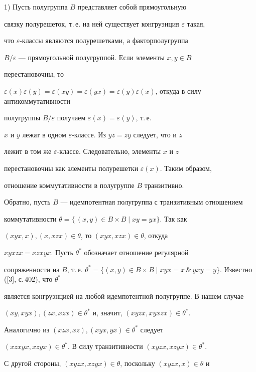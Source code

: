 \begin{pf}


1) Пусть полугруппа $B$ представляет собой прямоугольную


связку полурешеток, т.\,е. на ней существует конгруэнция $\varepsilon$ такая,


что $\varepsilon$-классы являются полурешетками, а факторполугруппа


$B/\varepsilon$ --- прямоугольной полугруппой. Если элементы $x,y\in B$


перестановочны, то


$\varepsilon(x)\varepsilon(y)=\varepsilon(xy)=\varepsilon(yx)


=\varepsilon(y)\varepsilon(x)$, откуда в силу антикоммутативности


полугруппы $B/\varepsilon$ получаем $\varepsilon(x)=\varepsilon(y)$, т.\,е.


$x$ и $y$ лежат в одном $\varepsilon$-классе. Из $yz=zy$ следует, что и $z$


лежит в том же $\varepsilon$-классе. Следовательно, элементы $x$ и $z$


перестановочны как элементы полурешетки $\varepsilon(x)$. Таким образом,


отношение коммутативности в полугруппе $B$ транзитивно.





Обратно, пусть $B$ --- идемпотентная полугруппа с транзитивным отношением


коммутативности $\theta=\{\,(x,y)\in B\times B\mid xy=yx\}$. Так как


$(xyx,x),(x,xzx)\in\theta$, то $(xyx,xzx)\in\theta$, откуда


$xyxzx=xzxyx$. Пусть $\theta^*$ обозначает отношение регулярной


сопряженности на $B$, т.\,е. $\theta^*=\{(x,y)\in B\times


B\mid xyx=x\,\&\,yxy=y\}$. Известно ([3], с.\,402), что $\theta^*$


является конгруэнцией на любой идемпотентной полугруппе. В нашем случае


$(xy,xyx),(zx,xzx)\in\theta^*$ и, значит, $(xyzx,xyxzx)\in\theta^*$.


Аналогично из $(xzx,xz),(xyx,yx)\in\theta^*$ следует


$(xzxyx,xzyx)\in\theta^*$. В силу транзитивности $(xyzx,xzyx)\in\theta^*$.


С другой стороны, $(xyzx,xzyx)\in\theta$, поскольку $(xyzx,x)\in\theta$ и



\end{pf}
